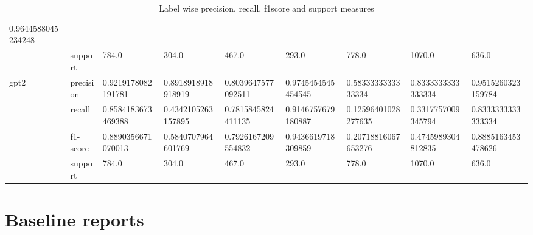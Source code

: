 \begin{landscape}
\begin{table}[]
{\begin{tabular}{@{}lllllllll@{}}
  \multicolumn{1}{l|}{0.9644588045234248} \\ \cmidrule(l){2-9} 
\multicolumn{1}{|l|}{} &
  \multicolumn{1}{l|}{support} &
  \multicolumn{1}{l|}{784.0} &
  \multicolumn{1}{l|}{304.0} &
  \multicolumn{1}{l|}{467.0} &
  \multicolumn{1}{l|}{293.0} &
  \multicolumn{1}{l|}{778.0} &
  \multicolumn{1}{l|}{1070.0} &
  \multicolumn{1}{l|}{636.0} \\ \midrule
\multicolumn{1}{|l|}{\multirow{4}{*}{gpt2}} &
  \multicolumn{1}{l|}{precision} &
  \multicolumn{1}{l|}{0.9219178082191781} &
  \multicolumn{1}{l|}{0.8918918918918919} &
  \multicolumn{1}{l|}{0.8039647577092511} &
  \multicolumn{1}{l|}{0.9745454545454545} &
  \multicolumn{1}{l|}{0.5833333333333334} &
  \multicolumn{1}{l|}{0.8333333333333334} &
  \multicolumn{1}{l|}{0.9515260323159784} \\ \cmidrule(l){2-9} 
\multicolumn{1}{|l|}{} &
  \multicolumn{1}{l|}{recall} &
  \multicolumn{1}{l|}{0.8584183673469388} &
  \multicolumn{1}{l|}{0.4342105263157895} &
  \multicolumn{1}{l|}{0.7815845824411135} &
  \multicolumn{1}{l|}{0.9146757679180887} &
  \multicolumn{1}{l|}{0.12596401028277635} &
  \multicolumn{1}{l|}{0.3317757009345794} &
  \multicolumn{1}{l|}{0.8333333333333334} \\ \cmidrule(l){2-9} 
\multicolumn{1}{|l|}{} &
  \multicolumn{1}{l|}{f1-score} &
  \multicolumn{1}{l|}{0.8890356671070013} &
  \multicolumn{1}{l|}{0.5840707964601769} &
  \multicolumn{1}{l|}{0.7926167209554832} &
  \multicolumn{1}{l|}{0.9436619718309859} &
  \multicolumn{1}{l|}{0.20718816067653276} &
  \multicolumn{1}{l|}{0.4745989304812835} &
  \multicolumn{1}{l|}{0.8885163453478626} \\ \cmidrule(l){2-9} 
\multicolumn{1}{|l|}{} &
  \multicolumn{1}{l|}{support} &
  \multicolumn{1}{l|}{784.0} &
  \multicolumn{1}{l|}{304.0} &
  \multicolumn{1}{l|}{467.0} &
  \multicolumn{1}{l|}{293.0} &
  \multicolumn{1}{l|}{778.0} &
  \multicolumn{1}{l|}{1070.0} &
  \multicolumn{1}{l|}{636.0} \\ \bottomrule
\end{tabular}%
}
\caption{Label wise precision, recall, f1score and support measures}
\label{tab:Per-Label-precision-recall-f-measure}
\end{table}
\end{landscape}

\section{Baseline reports}

